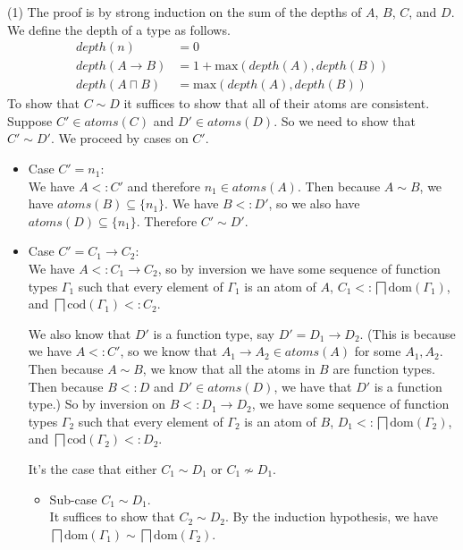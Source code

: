 \documentclass{article}
\newcommand{\ATOMS}[1]{\mathit{atoms}(#1)}
\newcommand{\sqinter}[0]{\bigsqcap}
\begin{document}
(1) The proof is by strong induction on the sum of the depths of $A$,
$B$, $C$, and $D$. We define the depth of a type as follows.
\begin{align*}
  \mathit{depth}(n) &= 0 \\
  \mathit{depth}(A \to B) &= 1 + \mathrm{max}(\mathit{depth}(A),\mathit{depth}(B)) \\
  \mathit{depth}(A \sqcap B) &= \mathrm{max}(\mathit{depth}(A),\mathit{depth}(B)) 
\end{align*}
To show that $C \sim D$ it suffices to show that
all of their atoms are consistent. Suppose $C' \in \ATOMS{C}$
and $D'\in\ATOMS{D}$. So we need to show that $C' \sim D'$.
We proceed by cases on $C'$.
\begin{itemize}
\item Case $C'=n_1$:\\
  We have $A <: C'$ and therefore $n_1 \in \ATOMS{A}$.
  Then because $A \sim B$, we have $\ATOMS{B} \subseteq \{n_1\}$.
  We have $B <: D'$, so we also have $\ATOMS{D} \subseteq \{n_1\}$.
  Therefore $C' \sim D'$.
  
\item Case $C'=C_1\to C_2$:\\
  We have $A <: C_1 \to C_2$, so by inversion we have
  some sequence of function types $\Gamma_1$ such that
  every element of $\Gamma_1$ is an atom of $A$,
  $C_1 <: \sqinter \mathrm{dom}(\Gamma_1)$,
  and $\sqinter \mathrm{cod}(\Gamma_1) <: C_2$.

  We also know that $D'$ is a function type, say $D'=D_1 \to D_2$.
  (This is because we have $A <: C'$, so we know that $A_1\to A_2 \in
  \ATOMS{A}$ for some $A_1,A_2$. Then because $A \sim B$, we know that
  all the atoms in $B$ are function types.  Then because $B <: D$ and
  $D' \in \ATOMS{D}$, we have that $D'$ is a function type.)
  So by inversion on $B <: D_1 \to D_2$, we have
  some sequence of function types $\Gamma_2$ such that
  every element of $\Gamma_2$ is an atom of $B$,
  $D_1 <: \sqinter \mathrm{dom}(\Gamma_2)$,
  and $\sqinter \mathrm{cod}(\Gamma_2) <: D_2$.

  It's the case that either $C_1 \sim D_1$ or $C_1 \not\sim D_1$.
  \begin{itemize}
  \item Sub-case $C_1 \sim D_1$.\\
    It suffices to show that $C_2 \sim D_2$.
    By the induction hypothesis, we have
    $\sqinter \mathrm{dom}(\Gamma_1) \sim \sqinter \mathrm{dom}(\Gamma_2)$.


\end{itemize}
\end{itemize}
\end{document}
